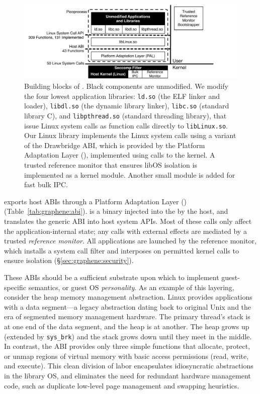 \begin{figure}[t]
\centering
\includegraphics[width=6.5in]{graphene/figures/arch.pdf}
\caption[The \sysname{} building blocks]
{Building blocks of \sysname{}.  Black components are unmodified.
We modify the four lowest application libraries:
{\tt ld.so} (the ELF linker and loader),
{\tt libdl.so} (the dynamic library linker),
{\tt libc.so} (standard library C),
and {\tt libpthread.so} (standard threading library),
that issue Linux system calls as function calls directly to {\tt libLinux.so}.
Our Linux library implements the Linux system calls
using a variant of the Drawbridge ABI,
which is provided by the Platform Adaptation Layer (\pal{}),
implemented using calls to the kernel.
A trusted reference monitor that ensures libOS isolation
is implemented as a kernel module.
Another small module is added for fast bulk IPC.}
\label{fig:graphene:arch}
\end{figure}


\sysname{} exports \palcalls{} host ABIs through a 
Platform Adaptation Layer (\pal{}) (Table~\ref{tab:graphene:abi}).
\pal{} is a binary injected into the \picoproc{} by the host, 
and translates the generic \picoproc{} ABI into host system APIs.
Most of these calls only affect the application-internal state;
any calls with external effects are mediated by a trusted {\em reference monitor}.  
All \sysname{} applications are launched by the reference monitor,
which installs a system call filter and interposes on permitted kernel calls to ensure isolation
(\S\ref{sec:graphene:security}).


These \pal{} ABIs should be a sufficient substrate upon which to
implement guest-specific semantics, or guest OS {\em personality}.
As an example of this layering, consider the heap memory management abstraction.
Linux provides applications with a data segment---a 
legacy abstraction dating back to original Unix and the era 
of segmented memory management hardware.
The primary thread's stack is at one end of the data segment, and the heap is at another.  
The heap grows up (extended by {\tt sys\_brk}) 
and the stack grows down until they meet in the middle.
In contrast, the \pal{} ABI provides only three simple functions 
that allocate, protect, or unmap regions of virtual memory
with basic access permissions (read, write, and execute).
This clean division of labor encapsulates 
idiosyncratic abstractions in the library OS,
and eliminates the need for
redundant hardware management code, 
such as duplicate low-level page management and swapping heuristics.


